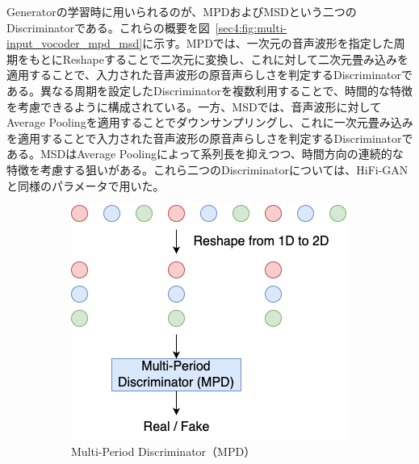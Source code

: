 \documentclass[12pt]{jarticle}
\numberwithin{equation}{section}    %
\numberwithin{figure}{section}      %
\numberwithin{table}{section}      %
\begin{document}
Generatorの学習時に用いられるのが、MPDおよびMSDという二つのDiscriminatorである。これらの概要を図~\ref{sec4:fig:multi-input_vocoder_mpd_msd}に示す。MPDでは、一次元の音声波形を指定した周期をもとにReshapeすることで二次元に変換し、これに対して二次元畳み込みを適用することで、入力された音声波形の原音声らしさを判定するDiscriminatorである。異なる周期を設定したDiscriminatorを複数利用することで、時間的な特徴を考慮できるように構成されている。一方、MSDでは、音声波形に対してAverage Poolingを適用することでダウンサンプリングし、これに一次元畳み込みを適用することで入力された音声波形の原音声らしさを判定するDiscriminatorである。MSDはAverage Poolingによって系列長を抑えつつ、時間方向の連続的な特徴を考慮する狙いがある。これら二つのDiscriminatorについては、HiFi-GANと同様のパラメータで用いた。
\begin{figure}[bt]
    \centering
    \begin{subfigure}{0.45\textwidth}
        \centering
        \includegraphics[width=\linewidth]{./figure/sec4/model/mpd.png}
        \caption{Multi-Period Discriminator（MPD）}
        \label{sec4:fig:multi-input_vocoder_mpd}
    \end{subfigure}
    \hfill
    \begin{subfigure}{0.45\textwidth}
        \centering

\end{subfigure}
\end{figure}
\end{document}
